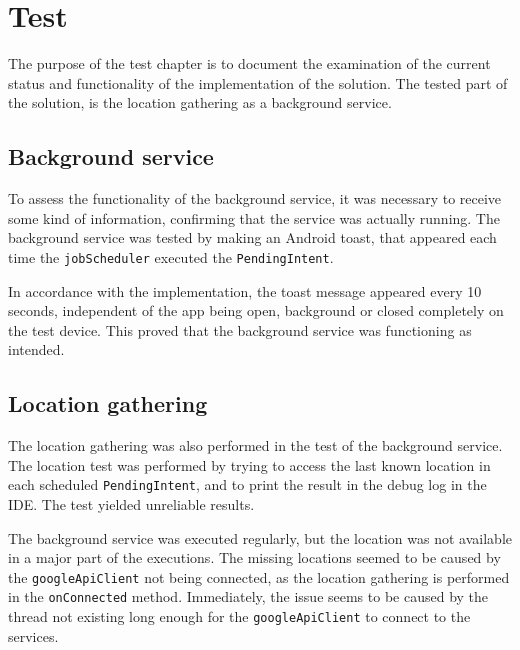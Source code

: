 \section{Test}
The purpose of the test chapter is to document the examination of the current status and functionality of the implementation of the solution.
The tested part of the solution, is the location gathering as a background service.


\subsection{Background service}
To assess the functionality of the background service, it was necessary to receive some kind of information, confirming that the service was actually running.
The background service was tested by making an Android toast, that appeared each time the \texttt{jobScheduler} executed the \texttt{PendingIntent}.

In accordance with the implementation, the toast message appeared every 10 seconds, independent of the app being open, background or closed completely on the test device.
This proved that the background service was functioning as intended.

\subsection{Location gathering}
The location gathering was also performed in the test of the background service.
The location test was performed by trying to access the last known location in each scheduled \texttt{PendingIntent}, and to print the result in the debug log in the IDE.
The test yielded unreliable results.

The background service was executed regularly, but the location was not available in a major part of the executions.
The missing locations seemed to be caused by the \texttt{googleApiClient} not being connected, as the location gathering is performed in the \texttt{onConnected} method.
Immediately, the issue seems to be caused by the thread not existing long enough for the \texttt{googleApiClient} to connect to the services.


